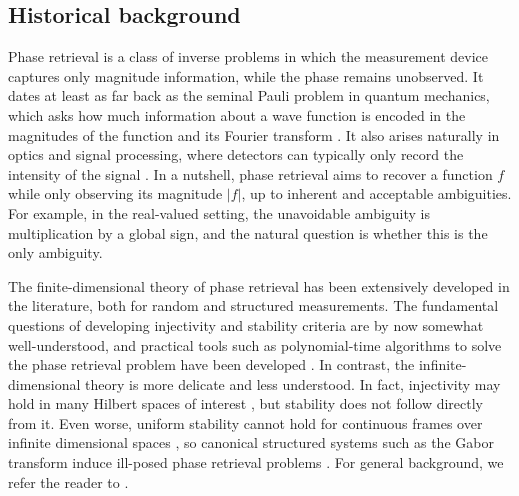 \documentclass[11pt]{amsart}
\numberwithin{equation}{section}
\theoremstyle{definition}
\theoremstyle{remark}
\begin{document}
\subsection{Historical background} Phase retrieval is a class of inverse problems in which the measurement device captures only magnitude information, while the phase remains unobserved. It dates at least as far back as the seminal Pauli problem in quantum mechanics, which asks how much information about a wave function is encoded in the magnitudes of the function and its Fourier transform \cite{MR3552875,MR3256781,pauli1933allgemeinen,ramos-sousa-pauli}. It also arises naturally in optics and signal processing, where detectors can typically only record  the  intensity of the signal \cite{MR3069958,eldar2014stability,grohs2020survey,sanz1984phase}. In a nutshell, phase retrieval aims to recover a function $f$ while only observing its magnitude $|f|$, up to inherent and acceptable ambiguities. For example, in the real-valued setting, the unavoidable
ambiguity is multiplication by a global sign, and the natural question is whether
this is the only ambiguity.  

The finite-dimensional theory of phase retrieval has been extensively developed in the literature, both for random and structured measurements. The fundamental questions of developing injectivity and stability criteria are by now somewhat well-understood, and practical tools such as polynomial-time algorithms to solve the phase retrieval problem
 have been developed \cite{bandeira2014saving,MR3260258,MR3069958,DB,eldar2014stability,MR3746047,KS}.
In contrast, the infinite-dimensional theory is more delicate and less understood. In fact, injectivity may hold in many Hilbert spaces of interest \cite{cahill2016infinite,freeman2025cahill}, but stability does not follow directly from it. Even worse, uniform stability cannot hold for continuous
frames over infinite dimensional spaces \cite{AG-continuous-frames}, so canonical structured systems
such as the Gabor transform induce ill-posed phase retrieval problems
\cite{alaifari2021gabor,alaifari2025cheeger,grohs2021stable,steinerberger2020stability}. For general background, we refer the reader to \cite{grohs2020survey}.
\end{document}
